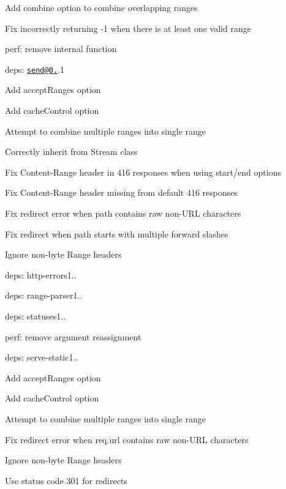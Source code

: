 \begin{DoxyItemize}
\begin{DoxyItemize}
\item Add {\ttfamily combine} option to combine overlapping ranges
\item Fix incorrectly returning -\/1 when there is at least one valid range
\item perf\+: remove internal function
\end{DoxyItemize}
\item deps\+: \href{mailto:send@0.14}{\tt send@0.}.1
\begin{DoxyItemize}
\item Add {\ttfamily accept\+Ranges} option
\item Add {\ttfamily cache\+Control} option
\item Attempt to combine multiple ranges into single range
\item Correctly inherit from {\ttfamily Stream} class
\item Fix {\ttfamily Content-\/\+Range} header in 416 responses when using {\ttfamily start}/{\ttfamily end} options
\item Fix {\ttfamily Content-\/\+Range} header missing from default 416 responses
\item Fix redirect error when {\ttfamily path} contains raw non-\/\+U\+RL characters
\item Fix redirect when {\ttfamily path} starts with multiple forward slashes
\item Ignore non-\/byte {\ttfamily Range} headers
\item deps\+: http-\/errors1..
\item deps\+: range-\/parser1..
\item deps\+: statuses1..
\item perf\+: remove argument reassignment
\end{DoxyItemize}
\item deps\+: serve-\/static1..
\begin{DoxyItemize}
\item Add {\ttfamily accept\+Ranges} option
\item Add {\ttfamily cache\+Control} option
\item Attempt to combine multiple ranges into single range
\item Fix redirect error when {\ttfamily req.\+url} contains raw non-\/\+U\+RL characters
\item Ignore non-\/byte {\ttfamily Range} headers
\item Use status code 301 for redirects

\end{DoxyItemize}
\end{DoxyItemize}
